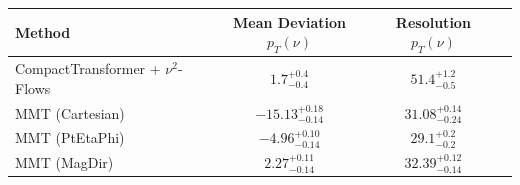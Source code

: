     \begin{tabular}{lccc}
        \toprule
        Method & Mean Deviation $p_{T}({\nu})$ & Resolution $p_{T}({\nu})$ \\
        \midrule
        CompactTransformer + $\nu^2$-Flows & $1.7^{+0.4}_{-0.4}$ & $51.4^{+1.2}_{-0.5}$ \\
        MMT (Cartesian) & $-15.13^{+0.18}_{-0.14}$ & $31.08^{+0.14}_{-0.24}$ \\
        MMT (PtEtaPhi) & $-4.96^{+0.10}_{-0.14}$ & $29.1^{+0.2}_{-0.2}$ \\
        MMT (MagDir) & $2.27^{+0.11}_{-0.14}$ & $32.39^{+0.12}_{-0.14}$ \\
        \bottomrule
    \end{tabular}